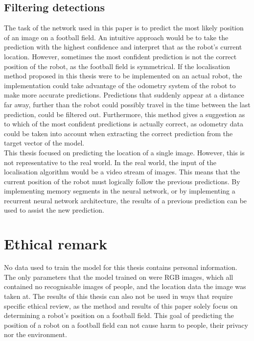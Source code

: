 \documentclass{uva-inf-bachelor-thesis}
\begin{document}
        \subsection{Filtering detections}
            The task of the network used in this paper is to predict the most likely position of an image on a football field. An intuitive approach would be to take the prediction with the highest confidence and interpret that as the robot's current location. However, sometimes the most confident prediction is not the correct position of the robot, as the football field is symmetrical.
            If the localisation method proposed in this thesis were to be implemented on an actual robot, the implementation could take advantage of the odometry system of the robot to make more accurate predictions. Predictions that suddenly appear at a distance far away, further than the robot could possibly travel in the time between the last prediction, could be filtered out. Furthermore, this method gives a suggestion as to which of the most confident predictions is actually correct, as odometry data could be taken into account when extracting the correct prediction from the target vector of the model. \\
            This thesis focused on predicting the location of a single image. However, this is not representative to the real world. In the real world, the input of the localisation algorithm would be a video stream of images. This means that the current position of the robot must logically follow the previous predictions. By implementing memory segments in the neural network, or by implementing a recurrent neural network architecture, the results of a previous prediction can be used to assist the new prediction. 


    \section{Ethical remark}
        No data used to train the model for this thesis contains personal information. The only parameters that the model trained on were RGB images, which all contained no recognisable images of people, and the location data the image was taken at. The results of this thesis can also not be used in ways that require specific ethical review, as the method and results of this paper solely focus on determining a robot's position on a football field. This goal of predicting the position of a robot on a football field can not cause harm to people, their privacy nor the environment. 
\end{document}
